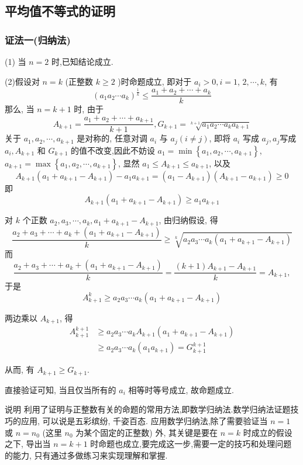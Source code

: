 \subsection{平均值不等式的证明}
\subsubsection*{证法一(归纳法)}

(1) 当 $n=2$ 时,已知结论成立.

(2)假设对 $n=k$ (正整数 $k \geqslant 2$ )时命题成立, 即对于 $a_{i}>0, i=1$, $2, \cdots, k$, 有
$$
\left(a_{1} a_{2} \cdots a_{k}\right)^{\frac{1}{k}} \leqslant \frac{a_{1}+a_{2}+\cdots+a_{k}}{k}
$$
那么, 当 $n=k+1$ 时, 由于
$$
A_{k+1}=\frac{a_{1}+a_{2}+\cdots+a_{k+1}}{k+1}, G_{k+1}=\sqrt[k+1]{a_{1} a_{2} \cdots a_{k} a_{k+1}}
$$
关于 $a_{1}, a_{2}, \cdots, a_{k+1}$ 是对称的, 任意对调 $a_{i}$ 与 $a_{j}(i \neq j)$, 即将 $a_{i}$ 写成 $a_{j}, a_{j}$写成 $a_{i}, A_{k+1}$ 和 $G_{k+1}$ 的值不改变,因此不妨设 $a_{1}=\min \left\{a_{1}, a_{2}, \cdots, a_{k+1}\right\}$, $a_{k+1}=\max \left\{a_{1}, a_{2}, \cdots, a_{k+1}\right\}$, 显然 $a_{1} \leqslant A_{k+1} \leqslant a_{k+1}$, 以及
$$
A_{k+1}\left(a_{1}+a_{k+1}-A_{k+1}\right)-a_{1} a_{k+1}=\left(a_{1}-A_{k+1}\right)\left(A_{k+1}-a_{k+1}\right) \geqslant 0
$$
即
$$
A_{k+1}\left(a_{1}+a_{k+1}-A_{k+1}\right) \geqslant a_{1} a_{k+1}
$$

对 $k$ 个正数 $a_{2}, a_{3}, \cdots, a_{k}, a_{1}+a_{k+1}-A_{k+1}$, 由归纳假设, 得
$$
\frac{a_{2}+a_{3}+\cdots+a_{k}+\left(a_{1}+a_{k+1}-A_{k+1}\right)}{k} \geqslant \sqrt[k]{a_{2} a_{3} \cdots a_{k}\left(a_{1}+a_{k+1}-A_{k+1}\right)}
$$
而
$$
\frac{a_{2}+a_{3}+\cdots+a_{k}+\left(a_{1}+a_{k+1}-A_{k+1}\right)}{k}=\frac{(k+1) A_{k+1}-A_{k+1}}{k}=A_{k+1},
$$
于是
$$
A_{k+1}^{k} \geqslant a_{2} a_{3} \cdots a_{k}\left(a_{1}+a_{k+1}-A_{k+1}\right)
$$

两边乘以 $A_{k+1}$, 得
$$
\begin{aligned}
A_{k+1}^{k+1} & \geqslant a_{2} a_{3} \cdots a_{k} A_{k+1}\left(a_{1}+a_{k+1}-A_{k+1}\right) \\
& \geqslant a_{2} a_{3} \cdots a_{k}\left(a_{1} a_{k+1}\right)=G_{k+1}^{k+1}
\end{aligned}
$$

从而, 有 $A_{k+1} \geqslant G_{k+1}$.

直接验证可知, 当且仅当所有的 $a_{i}$ 相等时等号成立, 故命题成立.

\begin{note}
说明 利用了证明与正整数有关的命题的常用方法,即数学归纳法.数学归纳法证题技巧的应用, 可以说是五彩缤纷, 千姿百态. 应用数学归纳法,除了需要验证当 $n=1$ 或 $n=n_{0}$ (这里 $n_{0}$ 为某个固定的正整数) 外, 其关键是要在 $n=k$ 时成立的假设之下, 导出当 $n=k+1$ 时命题也成立,要完成这一步,需要一定的技巧和处理问题的能力, 只有通过多做练习来实现理解和掌握.
\end{note}

